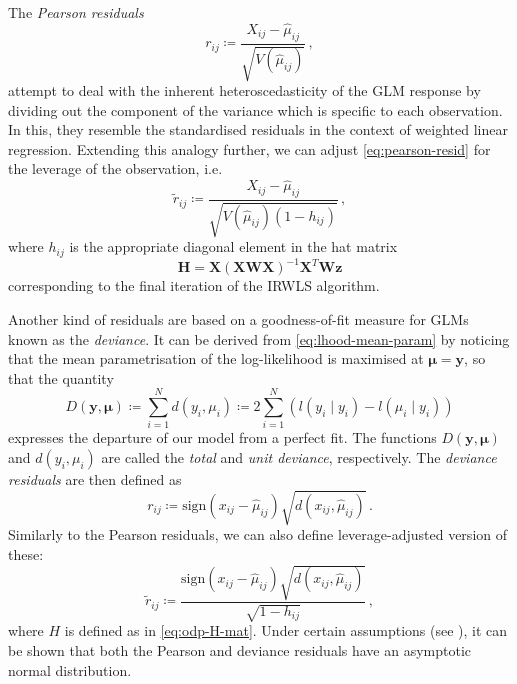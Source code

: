 \documentclass[a4paper]{book}
\begin{document}
The \emph{Pearson residuals}
\begin{equation} \label{eq:pearson-resid}
  r_{ij} \coloneqq \frac{X_{ij} - \widehat{\mu}_{ij}}{\sqrt{V(\widehat{\mu}_{ij})}} \,,
\end{equation}
attempt to deal with the inherent heteroscedasticity of the GLM response by dividing out the component of the variance which is specific to each observation. In this, they resemble the standardised residuals in the context of weighted linear regression. Extending this analogy further, we can adjust \cref{eq:pearson-resid} for the leverage of the observation, i.e.\
\begin{equation}
  \tilde{r}_{ij} \coloneqq \frac{X_{ij} - \widehat{\mu}_{ij}}{\sqrt{V(\widehat{\mu}_{ij}) (1 - h_{ij})}} \,,
\end{equation}
where $h_{ij}$ is the appropriate diagonal element in the hat matrix
\begin{equation} \label{eq:odp-H-mat}
  \mathbf{H} = \mathbf{X} (\mathbf{XWX})^{-1} \mathbf{X}^T \mathbf{W} \mathbf{z}
\end{equation}
corresponding to the final iteration of the IRWLS algorithm.

Another kind of residuals are based on a goodness-of-fit measure for GLMs known as the \emph{deviance}. It can be derived from \cref{eq:lhood-mean-param} by noticing that the mean parametrisation of the log-likelihood is maximised at $\bm{\mu} = \mathbf{y}$, so that the quantity
\begin{equation}
  D(\mathbf{y}, \bm{\mu}) \coloneqq \sum_{i = 1}^N d(y_i, \mu_i) \coloneqq 2 \sum_{i = 1}^N (l(y_i \mid y_i) - l(\widehat{\mu}_i \mid y_i))
\end{equation}
expresses the departure of our model from a perfect fit. The functions $D(\mathbf{y}, \bm{\mu})$ and $d(y_i, \mu_i)$ are called the \emph{total} and \emph{unit deviance}, respectively. The \emph{deviance residuals} are then defined as
\begin{equation}
  r_{ij} \coloneqq \mathrm{sign}(x_{ij} - \widehat{\mu}_{ij}) \sqrt{d(x_{ij}, \widehat{\mu}_{ij})} \,.
\end{equation}
Similarly to the Pearson residuals, we can also define leverage-adjusted version of these:
\begin{equation}
  \tilde{r}_{ij} \coloneqq \frac{\mathrm{sign}(x_{ij} - \widehat{\mu}_{ij}) \sqrt{d(x_{ij}, \widehat{\mu}_{ij})}}{\sqrt{1 - h_{ij}}} \,,
\end{equation}
where $H$ is defined as in \cref{eq:odp-H-mat}. Under certain assumptions (see \cite[Section 7.5]{dunn:rand-quant-res}), it can be shown that both the Pearson and deviance residuals have an asymptotic normal distribution.
\end{document}
